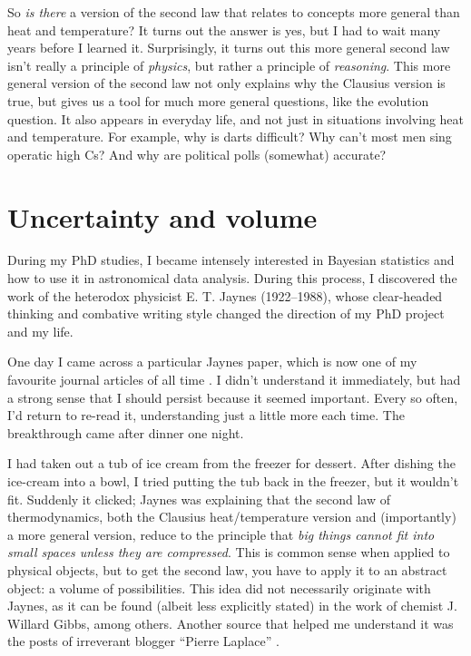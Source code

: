 \documentclass[a4paper, 12pt]{article}
\begin{document}
So {\em is there} a version of the second law that relates to concepts more
general than heat and temperature?
It turns out the answer is yes, but I had to wait many years before I learned it.
Surprisingly, it turns out this more general second law isn't really a
principle of {\em physics}, but rather a
principle of {\em reasoning}. This more general version of the
second law not only explains why the Clausius version is true, but gives us
a tool for much more general questions, like the evolution question.
It also appears in everyday life, and not just in situations involving heat and
temperature. For example,
why is darts difficult? Why can't most men sing operatic high Cs?
And why are political polls (somewhat) accurate?

\section*{Uncertainty and volume}
During my PhD studies, I became intensely interested in Bayesian statistics
\citep{brewer}
and how to use it in astronomical data analysis. During this process, I
discovered the work of the heterodox physicist E. T. Jaynes \citep{jaynes_site}
(1922--1988), whose clear-headed thinking and combative writing style
changed the direction of my PhD project and my life.

One day I came across a particular Jaynes paper, which is now one of my
favourite journal articles of all time
\citep{jaynes}. I didn't understand it
immediately, but had a strong sense that I should persist because it seemed
important. Every so often, I'd return to re-read it, understanding
just a little more each time. The breakthrough came after dinner one
night.

I had taken out a tub of ice cream from the freezer for dessert. After dishing
the ice-cream into a bowl, I tried putting the tub back in the freezer, but
it wouldn't fit. Suddenly it clicked; Jaynes was explaining that
the second law of thermodynamics, both the Clausius heat/temperature version
and (importantly) a more general version, reduce to the
principle that {\em big things cannot fit into small spaces unless they are
compressed}. This is common sense when applied to physical objects, but to
get the second law, you have to apply it to an abstract object: a volume
of possibilities. This idea did not necessarily originate with Jaynes, as it
can be found (albeit less explicitly stated)
in the work of chemist J. Willard Gibbs, among others. Another source that
helped me understand it was the posts of irreverant blogger ``Pierre Laplace''
\citep{pierre_laplace}.
\end{document}
